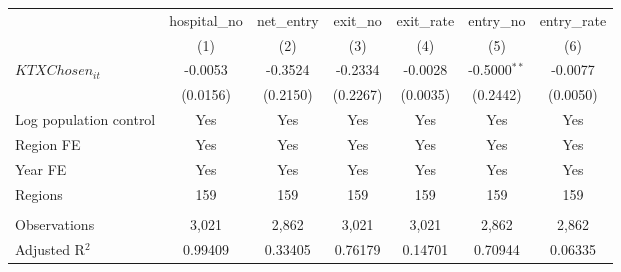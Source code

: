 \begingroup
\centering
\begin{tabular}{lcccccc}
   \toprule
                          & hospital\_no  & net\_entry  & exit\_no  & exit\_rate  & entry\_no      & entry\_rate \\    
                          & (1)           & (2)         & (3)       & (4)         & (5)            & (6)\\  
   \midrule 
   $KTXChosen_{it}$       & -0.0053       & -0.3524     & -0.2334   & -0.0028     & -0.5000$^{**}$ & -0.0077\\   
                          & (0.0156)      & (0.2150)    & (0.2267)  & (0.0035)    & (0.2442)       & (0.0050)\\   
   Log population control & Yes           & Yes         & Yes       & Yes         & Yes            & Yes\\  
   Region FE              & Yes           & Yes         & Yes       & Yes         & Yes            & Yes\\  
   Year FE                & Yes           & Yes         & Yes       & Yes         & Yes            & Yes\\  
   Regions                & 159           & 159         & 159       & 159         & 159            & 159\\  
    \\
   Observations           & 3,021         & 2,862       & 3,021     & 3,021       & 2,862          & 2,862\\  
   Adjusted R$^2$         & 0.99409       & 0.33405     & 0.76179   & 0.14701     & 0.70944        & 0.06335\\  
   \bottomrule
\end{tabular}
\par\endgroup
